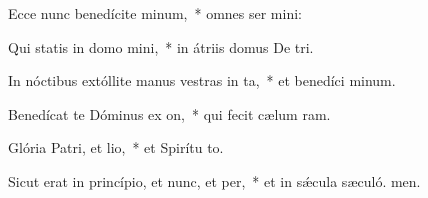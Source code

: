 \item Ecce nunc benedícite minum,~* omnes ser mini:
\item Qui statis in domo mini,~* in átriis domus De tri.
\item In nóctibus extóllite manus vestras in ta,~* et benedíci minum.
\item Benedícat te Dóminus ex on,~* qui fecit cælum  ram.
\item Glória Patri, et lio,~* et Spirítu to.
\item Sicut erat in princípio, et nunc, et per,~* et in sǽcula sæculó. men.
